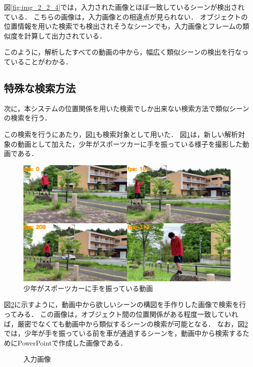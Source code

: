 \documentclass[a4j,12pt,dvipdfmx]{jreport}
\begin{document}
図\ref{fig:img_2_2_4}では，入力された画像とほぼ一致しているシーンが検出されている．
こちらの画像は，入力画像との相違点が見られない．
オブジェクトの位置情報を用いた検索でも検出されそうなシーンでも，入力画像とフレームの類似度を計算して出力されている．

このように，解析したすべての動画の中から，幅広く類似シーンの検出を行なっていることがわかる．

\subsection{特殊な検索方法}
次に，本システムの位置関係を用いた検索でしか出来ない検索方法で類似シーンの検索を行う．

この検索を行うにあたり，図\ref{fig:movie6}も検索対象として用いた．
図\ref{fig:movie6}は，新しい解析対象の動画として加えた，少年がスポーツカーに手を振っている様子を撮影した動画である．
\begin{figure}[b]
  \centering
  \includegraphics[width=13cm]{image/6_result.jpg}
  \caption{少年がスポーツカーに手を振っている動画}
  \label{fig:movie6}
\end{figure}

図\ref{fig:img_2_3}に示すように，動画中から欲しいシーンの構図を手作りした画像で検索を行ってみる．
この画像は，オブジェクト間の位置関係がある程度一致していれば，厳密でなくても動画中から類似するシーンの検索が可能となる．
なお，図\ref{fig:img_2_3}では，少年が手を振っている前を車が通過するシーンを，動画中から検索するためにPowerPointで作成した画像である．
\begin{figure}[b]
  \centering
  \caption{入力画像}
  \label{fig:img_2_3}
\end{figure}
\end{document}
